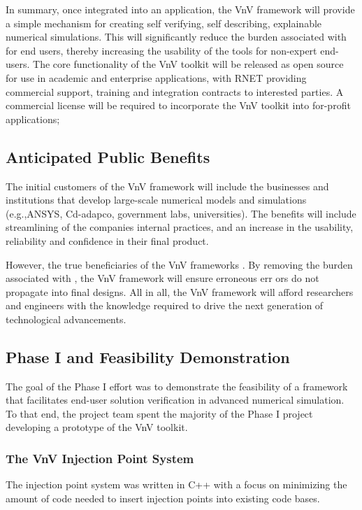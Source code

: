 In summary, once integrated into an application, the VnV framework will provide a simple mechanism for creating self verifying, self describing, explainable numerical simulations. This will significantly reduce the burden associated with \VV for end users, thereby increasing the usability of the tools for non-expert end-users. The core functionality of the VnV toolkit will be released as open source for use in academic and enterprise applications, with RNET providing commercial support, training and integration contracts to interested parties. A commercial license will be required to incorporate the VnV toolkit into for-profit applications;


\subsection{Anticipated Public Benefits}

The initial customers of the VnV framework will include the businesses and institutions that develop large-scale numerical models and simulations (e.g.,ANSYS, Cd-adapco, government labs, universities). The benefits will include streamlining of the companies internal \VV practices, and an increase in the usability, reliability and confidence in their final product.

However, the true beneficiaries of the VnV frameworks . By removing the burden associated with \VV, the VnV framework will ensure erroneous err ors do not propagate into final designs. All in all, the VnV framework will afford researchers and engineers with the knowledge required to drive the next generation of technological advancements. 

\subsection{Phase I and Feasibility Demonstration}

The goal of the Phase I effort was to demonstrate the feasibility of a framework that facilitates end-user solution
verification in advanced numerical simulation. To that end, the project team spent the majority of the Phase I
project developing a prototype of the VnV toolkit.

\subsubsection{The VnV Injection Point System}

The injection point system was written in C++ with a focus on minimizing the amount of 
code needed to insert injection points into existing code bases. 

